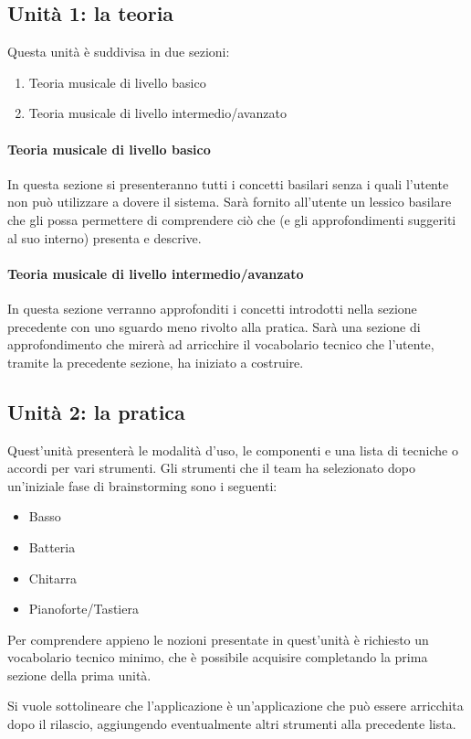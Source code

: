\subsection{Unità 1: la teoria}
Questa unità è suddivisa in due sezioni:
\begin{enumerate}
	\item Teoria musicale di livello basico
	\item Teoria musicale di livello intermedio/avanzato
\end{enumerate}

\paragraph{Teoria musicale di livello basico} In questa sezione si presenteranno
tutti i concetti basilari senza i quali l'utente non può utilizzare a dovere il
sistema. Sarà fornito all'utente un lessico basilare che gli possa permettere di
comprendere ciò che \ProjectTitle{} (e gli approfondimenti suggeriti al suo
interno) presenta e descrive. \paragraph{Teoria musicale di livello
intermedio/avanzato} In questa sezione verranno approfonditi i concetti
introdotti nella sezione precedente con uno sguardo meno rivolto alla pratica.
Sarà una sezione di approfondimento che mirerà ad arricchire il vocabolario
tecnico che l'utente, tramite la precedente sezione, ha iniziato a costruire.

\subsection{Unità 2: la pratica}
Quest'unità presenterà le modalità d'uso, le componenti e una lista di tecniche
o accordi per vari strumenti. Gli strumenti che il team ha selezionato dopo
un'iniziale fase di brainstorming sono i seguenti:
\begin{itemize}
	\item Basso
	\item Batteria
	\item Chitarra
	\item Pianoforte/Tastiera
\end{itemize}
Per comprendere appieno le nozioni presentate in quest'unità è richiesto un
vocabolario tecnico minimo, che è possibile acquisire completando la prima
sezione della prima unità.

Si vuole sottolineare che l'applicazione \ProjectTitle{} è un'applicazione che
può essere arricchita dopo il rilascio, aggiungendo eventualmente altri
strumenti alla precedente lista.

